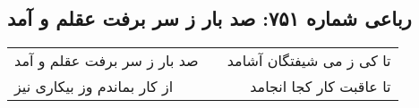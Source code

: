 \begin{center}
\section*{رباعی شماره ۷۵۱: صد بار ز سر برفت عقلم و آمد}
\label{sec:0751}
\begin{longtable}{l p{0.5cm} r}
صد بار ز سر برفت عقلم و آمد
&&
تا کی ز می شیفتگان آشامد
\\
از کار بماندم وز بیکاری نیز
&&
تا عاقبت کار کجا انجامد
\\
\end{longtable}
\end{center}
